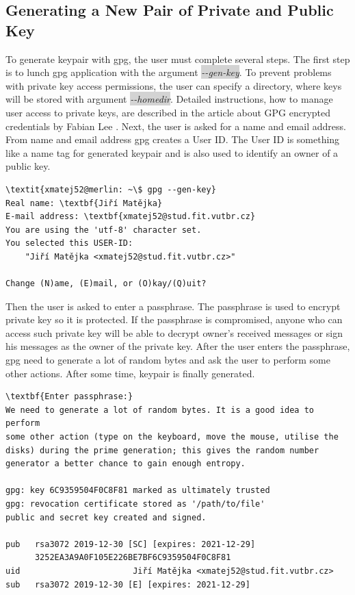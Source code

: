 \subsection*{Generating a New Pair of Private and Public Key}
To generate keypair with gpg, the user must complete several steps. The first step is to lunch gpg application with the argument \colorbox{lightgray}{\textit{-{}-gen-key}}. To prevent problems with private key access permissions, the user can specify a directory, where keys will be stored with argument \colorbox{lightgray}{\textit{-{}-homedir}}. Detailed instructions, how to manage user access to private keys, are described in the article about GPG encrypted credentials by Fabian Lee \cite{gpgAccess}.  Next, the user is asked for a name and email address. From name and email address gpg creates a User ID. The User ID is something like a name tag for generated keypair and is also used to identify an owner of a public key.
\begin{Verbatim}[commandchars=\\\{\},codes={\catcode`$=3\catcode`_=8},samepage=true,frame=single]
\textit{xmatej52@merlin: ~\$ gpg --gen-key}
Real name: \textbf{Jiří Matějka}
E-mail address: \textbf{xmatej52@stud.fit.vutbr.cz}
You are using the 'utf-8' character set.
You selected this USER-ID:
    "Jiří Matějka <xmatej52@stud.fit.vutbr.cz>"

Change (N)ame, (E)mail, or (O)kay/(Q)uit?
\end{Verbatim}

Then the user is asked to enter a passphrase. The passphrase is used to encrypt private key so it is protected. If the passphrase is compromised, anyone who can access such private key will be able to decrypt owner's received messages or sign his messages as the owner of the private key. After the user enters the passphrase, gpg need to generate a lot of random bytes and ask the user to perform some other actions. After some time, keypair is finally generated.
\begin{Verbatim}[commandchars=\\\{\},codes={\catcode`$=3\catcode`_=8},samepage=true,frame=single]
\textbf{Enter passphrase:}
We need to generate a lot of random bytes. It is a good idea to perform
some other action (type on the keyboard, move the mouse, utilise the
disks) during the prime generation; this gives the random number
generator a better chance to gain enough entropy.

gpg: key 6C9359504F0C8F81 marked as ultimately trusted
gpg: revocation certificate stored as '/path/to/file'
public and secret key created and signed.

pub   rsa3072 2019-12-30 [SC] [expires: 2021-12-29]
      3252EA3A9A0F105E226BE7BF6C9359504F0C8F81
uid                       Jiří Matějka <xmatej52@stud.fit.vutbr.cz>
sub   rsa3072 2019-12-30 [E] [expires: 2021-12-29]
\end{Verbatim}

